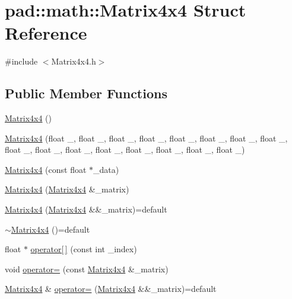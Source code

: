 \hypertarget{structpad_1_1math_1_1_matrix4x4}{}\section{pad\+:\+:math\+:\+:Matrix4x4 Struct Reference}
\label{structpad_1_1math_1_1_matrix4x4}


{\ttfamily \#include $<$Matrix4x4.\+h$>$}

\subsection*{Public Member Functions}
\begin{DoxyCompactItemize}
\item 
\mbox{\hyperlink{structpad_1_1math_1_1_matrix4x4_a47a4ff74b250afd42a5b31d267de93b2}{Matrix4x4}} ()
\item 
\mbox{\hyperlink{structpad_1_1math_1_1_matrix4x4_aee393ac9af00f6227e7f6d4d6b9f569f}{Matrix4x4}} (float \+\_, float \+\_, float \+\_, float \+\_, float \+\_, float \+\_, float \+\_, float \+\_, float \+\_, float \+\_, float \+\_, float \+\_, float \+\_, float \+\_, float \+\_, float \+\_)
\item 
\mbox{\hyperlink{structpad_1_1math_1_1_matrix4x4_a4765cd7d89d392b63c067353fe2a89f7}{Matrix4x4}} (const float $\ast$\+\_\+data)
\item 
\mbox{\hyperlink{structpad_1_1math_1_1_matrix4x4_a6866f52ee1300609262d13a20ea9a9ad}{Matrix4x4}} (\mbox{\hyperlink{structpad_1_1math_1_1_matrix4x4}{Matrix4x4}} \&\+\_\+matrix)
\item 
\mbox{\hyperlink{structpad_1_1math_1_1_matrix4x4_a2486278c1674f08e20c4d5fbede0b32c}{Matrix4x4}} (\mbox{\hyperlink{structpad_1_1math_1_1_matrix4x4}{Matrix4x4}} \&\&\+\_\+matrix)=default
\item 
\mbox{\hyperlink{structpad_1_1math_1_1_matrix4x4_a19a252dba1b3f4134b0755c8d49ed161}{$\sim$\+Matrix4x4}} ()=default
\item 
float $\ast$ \mbox{\hyperlink{structpad_1_1math_1_1_matrix4x4_acf1ce7bb39d6a1c41db0968d42767b92}{operator\mbox{[}$\,$\mbox{]}}} (const int \+\_\+index)
\item 
void \mbox{\hyperlink{structpad_1_1math_1_1_matrix4x4_ab14377405265dfb8c0adc47974598e7c}{operator=}} (const \mbox{\hyperlink{structpad_1_1math_1_1_matrix4x4}{Matrix4x4}} \&\+\_\+matrix)
\item 
\mbox{\hyperlink{structpad_1_1math_1_1_matrix4x4}{Matrix4x4}} \& \mbox{\hyperlink{structpad_1_1math_1_1_matrix4x4_aab7a3a99bd9ca243483c4a9bdb11243d}{operator=}} (\mbox{\hyperlink{structpad_1_1math_1_1_matrix4x4}{Matrix4x4}} \&\&\+\_\+matrix)=default

\end{DoxyCompactItemize}
